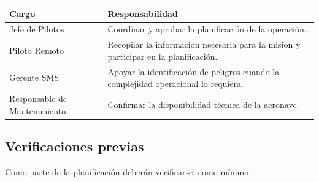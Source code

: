 \begin{table}[H]

\renewcommand{\arraystretch}{1.4}

\begin{tabularx}{\textwidth}{|p{5cm}|X|}

\hline

\textbf{Cargo} &
\textbf{Responsabilidad}

\\ \hline

Jefe de Pilotos &
Coordinar y aprobar la planificación de la operación.

\\ \hline

Piloto Remoto &
Recopilar la información necesaria para la misión y participar en la planificación.

\\ \hline

Gerente SMS &
Apoyar la identificación de peligros cuando la complejidad operacional lo requiera.

\\ \hline

Responsable de Mantenimiento &
Confirmar la disponibilidad técnica de la aeronave.

\\ \hline

\end{tabularx}

\end{table}


\subsection{Verificaciones previas}

Como parte de la planificación deberán verificarse, como mínimo:

